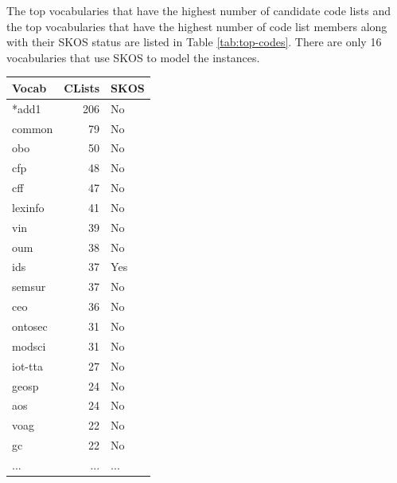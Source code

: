 The top vocabularies that have the highest number of candidate code lists and the top vocabularies that have the highest number of code list members along with their SKOS status are listed in Table \ref{tab:top-codes}. There are only 16 vocabularies that use SKOS to model the instances.

\begin{table}[h]
\footnotesize
\begin{tabular}{|l|r|l|}
\hline
\textbf{Vocab} & \textbf{CLists} & \textbf{SKOS} \\ \hline
*add1     & 206         & No   \\ \hline
common    & 79          & No   \\ \hline
obo       & 50          & No   \\ \hline
cfp       & 48          & No   \\ \hline
cff       & 47          & No   \\ \hline
lexinfo   & 41          & No   \\ \hline
vin       & 39          & No   \\ \hline
oum       & 38          & No   \\ \hline
ids       & 37          & Yes  \\ \hline
semsur    & 37          & No   \\ \hline
ceo       & 36          & No   \\ \hline
ontosec   & 31          & No   \\ \hline
modsci    & 31          & No   \\ \hline
iot-tta   & 27          & No   \\ \hline
geosp     & 24          & No   \\ \hline
aos       & 24          & No   \\ \hline
voag      & 22          & No   \\ \hline
gc        & 22          & No   \\ \hline
...       & ...         & ...   \\ \hline

\end{tabular}
\end{table}
